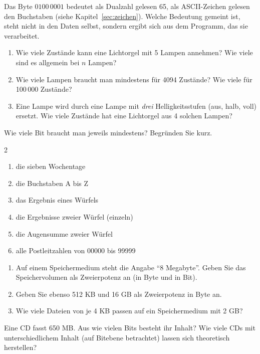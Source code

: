 Das Byte $0100\,0001$ bedeutet als Dualzahl gelesen 65, als ASCII-Zeichen gelesen den Buchstaben  (siehe Kapitel~\ref{sec:zeichen}). Welche Bedeutung gemeint ist, steht nicht in den Daten selbst, sondern ergibt sich aus dem Programm, das sie verarbeitet.

\aufgaben
{}
\begin{enumerate}[label=\alph*)]
\item Wie viele Zustände kann eine Lichtorgel mit 5 Lampen annehmen? Wie viele sind es allgemein bei $n$ Lampen?
\item Wie viele Lampen braucht man mindestens für 4094 Zustände? Wie viele für 100\,000 Zustände?
\item Eine Lampe wird durch eine Lampe mit \emph{drei} Helligkeitsstufen (aus, halb, voll) ersetzt. Wie viele Zustände hat eine Lichtorgel aus 4 solchen Lampen?
\end{enumerate}

Wie viele Bit braucht man jeweils mindestens? Begründen Sie kurz.
\begin{multicols}{2}
\begin{enumerate}[label=\alph*)]
\item die sieben Wochentage
\item die Buchstaben A bis Z
\item das Ergebnis eines Würfels
\item die Ergebnisse zweier Würfel (einzeln)
\item die Augensumme zweier Würfel
\item alle Postleitzahlen von 00000 bis 99999
\end{enumerate}
\end{multicols}

\begin{enumerate}[label=\alph*)]
\item Auf einem Speichermedium steht die Angabe \enquote{8 Megabyte}. Geben Sie das Speichervolumen als Zweierpotenz an (in Byte und in Bit).
\item Geben Sie ebenso 512 KB und 16 GB als Zweierpotenz in Byte an.
\item Wie viele Dateien von je 4 KB passen auf ein Speichermedium mit 2 GB?
\end{enumerate}

Eine CD fasst 650 MB. Aus wie vielen Bits besteht ihr Inhalt? Wie viele CDs mit unterschiedlichem Inhalt (auf Bitebene betrachtet) lassen sich theoretisch herstellen?


